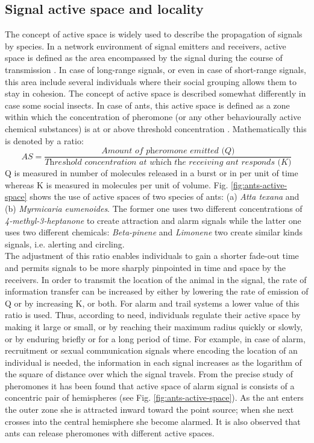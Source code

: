 \subsection{Signal active space and locality}
The concept of active space is widely used to describe the propagation of signals by species. In a network environment of signal emitters and receivers, active space is defined as the area encompassed by the signal during the course of transmission \cite{Mcgregor2000}. In case of long-range signals, or even in case of short-range signals, this area include several individuals where their social grouping allows them to stay in cohesion. The concept of active space is described somewhat differently in case some social insects. In case of ants, this active space is defined as a zone within which the concentration of pheromone (or any other behaviourally active chemical substances) is at or above threshold concentration \cite{Holldobler1990}. Mathematically this is denoted by a ratio:
\begin{equation}
AS = \frac{\textit{Amount of pheromone emitted (Q)}}{\textit{Threshold concentration at which the receiving ant responds (K)}}
\end{equation}
Q is measured in number of molecules released in a burst or in per unit of time whereas K is measured in molecules per unit of volume. 
Fig. \ref{fig:ants-active-space} shows the use of active spaces of two species of ants: (a) {\em Atta texana} and (b) {\em Myrmicaria eumenoides}.  The former one uses two different concentrations of {\em 4-methyl-3-heptanone} to create attraction and alarm signals while the latter one uses two different chemicals: {\em Beta-pinene} and {\em Limonene} two create similar kinds signals, i.e. alerting and circling.\\ 
The adjustment of this ratio enables individuals to gain a shorter fade-out time and permits signals to be more sharply pinpointed in time and space by the receivers. In order to transmit the location of the animal in the signal, the rate of information transfer can be increased by either by lowering the rate of emission of Q or by increasing K, or both. For alarm and trail systems a lower value of this ratio is used. Thus, according to need, individuals regulate their active space by making it large or small, or by reaching their maximum radius quickly or slowly, or by enduring briefly or for a long period of time. For example, in case of alarm, recruitment or sexual communication signals where encoding the location of an individual is needed, the information in each signal increases as the logarithm of the square of distance over which the signal travels. From the precise study of pheromones it has been found that active space of alarm signal is consists of a concentric pair of hemispheres (see Fig. \ref{fig:ants-active-space}). As the ant enters the outer zone she is attracted inward toward the point source; when she next crosses into the central hemisphere she become alarmed. It is also observed that ants can release pheromones with different active spaces.\\
